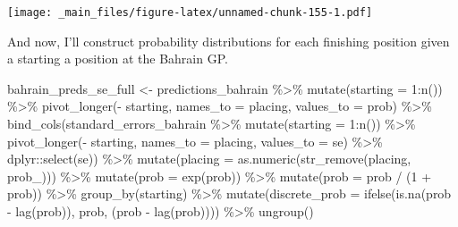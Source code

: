 \documentclass[
]{book}
\newenvironment{Shaded}{\begin{snugshade}}{\end{snugshade}}
\newcommand{\AttributeTok}[1]{\textcolor[rgb]{0.77,0.63,0.00}{#1}}
\newcommand{\DecValTok}[1]{\textcolor[rgb]{0.00,0.00,0.81}{#1}}
\newcommand{\FunctionTok}[1]{\textcolor[rgb]{0.00,0.00,0.00}{#1}}
\newcommand{\NormalTok}[1]{#1}
\newcommand{\OtherTok}[1]{\textcolor[rgb]{0.56,0.35,0.01}{#1}}
\newcommand{\SpecialCharTok}[1]{\textcolor[rgb]{0.00,0.00,0.00}{#1}}
\newcommand{\StringTok}[1]{\textcolor[rgb]{0.31,0.60,0.02}{#1}}
\begin{document}
\texttt{[image: \_main\_files/figure-latex/unnamed-chunk-155-1.pdf]}

And now, I'll construct probability distributions for each finishing position given a starting a position at the Bahrain GP.

\begin{Shaded}
\begin{Highlighting}[]
\NormalTok{bahrain\_preds\_se\_full }\OtherTok{\textless{}{-}}\NormalTok{ predictions\_bahrain }\SpecialCharTok{\%\textgreater{}\%}
  \FunctionTok{mutate}\NormalTok{(}\AttributeTok{starting =} \DecValTok{1}\SpecialCharTok{:}\FunctionTok{n}\NormalTok{()) }\SpecialCharTok{\%\textgreater{}\%}
  \FunctionTok{pivot\_longer}\NormalTok{(}\SpecialCharTok{{-}}\NormalTok{ starting, }\AttributeTok{names\_to =} \StringTok{\textquotesingle{}placing\textquotesingle{}}\NormalTok{, }\AttributeTok{values\_to =} \StringTok{\textquotesingle{}prob\textquotesingle{}}\NormalTok{) }\SpecialCharTok{\%\textgreater{}\%} 
  \FunctionTok{bind\_cols}\NormalTok{(standard\_errors\_bahrain }\SpecialCharTok{\%\textgreater{}\%} \FunctionTok{mutate}\NormalTok{(}\AttributeTok{starting =} \DecValTok{1}\SpecialCharTok{:}\FunctionTok{n}\NormalTok{()) }\SpecialCharTok{\%\textgreater{}\%}
  \FunctionTok{pivot\_longer}\NormalTok{(}\SpecialCharTok{{-}}\NormalTok{ starting, }\AttributeTok{names\_to =} \StringTok{\textquotesingle{}placing\textquotesingle{}}\NormalTok{, }\AttributeTok{values\_to =} \StringTok{\textquotesingle{}se\textquotesingle{}}\NormalTok{) }\SpecialCharTok{\%\textgreater{}\%}
\NormalTok{    dplyr}\SpecialCharTok{::}\FunctionTok{select}\NormalTok{(se)) }\SpecialCharTok{\%\textgreater{}\%}
  \FunctionTok{mutate}\NormalTok{(}\AttributeTok{placing =} \FunctionTok{as.numeric}\NormalTok{(}\FunctionTok{str\_remove}\NormalTok{(placing, }\StringTok{\textquotesingle{}prob\_\textquotesingle{}}\NormalTok{))) }\SpecialCharTok{\%\textgreater{}\%}
  \FunctionTok{mutate}\NormalTok{(}\AttributeTok{prob =} \FunctionTok{exp}\NormalTok{(prob)) }\SpecialCharTok{\%\textgreater{}\%}
  \FunctionTok{mutate}\NormalTok{(}\AttributeTok{prob =}\NormalTok{ prob }\SpecialCharTok{/}\NormalTok{ (}\DecValTok{1} \SpecialCharTok{+}\NormalTok{ prob)) }\SpecialCharTok{\%\textgreater{}\%}
  \FunctionTok{group\_by}\NormalTok{(starting) }\SpecialCharTok{\%\textgreater{}\%} 
  \FunctionTok{mutate}\NormalTok{(}\AttributeTok{discrete\_prob =} \FunctionTok{ifelse}\NormalTok{(}\FunctionTok{is.na}\NormalTok{(prob }\SpecialCharTok{{-}} \FunctionTok{lag}\NormalTok{(prob)), prob, (prob }\SpecialCharTok{{-}} \FunctionTok{lag}\NormalTok{(prob)))) }\SpecialCharTok{\%\textgreater{}\%}
  \FunctionTok{ungroup}\NormalTok{()}


\end{Highlighting}
\end{Shaded}
\end{document}
